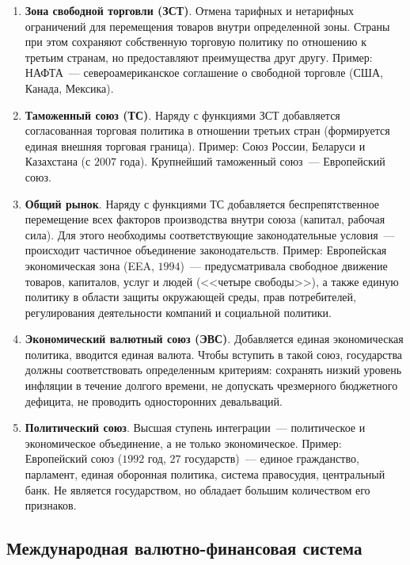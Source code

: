 \documentclass[12pt]{article}
\begin{document}
    \begin{enumerate}
    	\item \textbf{Зона свободной торговли (ЗСТ)}. Отмена тарифных и нетарифных ограничений для перемещения товаров внутри определенной зоны. Страны при этом сохраняют собственную торговую политику по отношению к третьим странам, но предоставляют преимущества друг другу. Пример: НАФТА~--- североамериканское соглашение о свободной торговле (США, Канада, Мексика).
    	
    	\item \textbf{Таможенный союз (ТС)}. Наряду с функциями ЗСТ добавляется согласованная торговая политика в отношении третьих стран (формируется единая внешняя торговая граница). Пример: Союз России, Беларуси и Казахстана (с $2007$ года). Крупнейший таможенный союз~--- Европейский союз.
    	
    	\item \textbf{Общий рынок}. Наряду с функциями ТС добавляется беспрепятственное перемещение всех факторов производства внутри союза (капитал, рабочая сила). Для этого необходимы соответствующие законодательные условия~--- происходит частичное объединение законодательств. Пример: Европейская экономическая зона (EEA, $1994$)~--- предусматривала свободное движение товаров, капиталов, услуг и людей (<<четыре свободы>>), а также единую политику в области защиты окружающей среды, прав потребителей, регулирования деятельности компаний и социальной политики.
    	
    	\item \textbf{Экономический валютный союз (ЭВС)}. Добавляется единая экономическая политика, вводится единая валюта. Чтобы вступить в такой союз, государства должны соответствовать определенным критериям: сохранять низкий уровень инфляции в течение долгого времени, не допускать чрезмерного бюджетного дефицита, не проводить односторонних девальваций.
    	
    	\item \textbf{Политический союз}. Высшая ступень интеграции~--- политическое и экономическое объединение, а не только экономическое. Пример: Европейский союз ($1992$ год, $27$ государств)~--- единое гражданство, парламент, единая оборонная политика, система правосудия, центральный банк. Не является государством, но обладает большим количеством его признаков.
    \end{enumerate}
    
    \subsection{Международная валютно-финансовая система}
    
\end{document}
